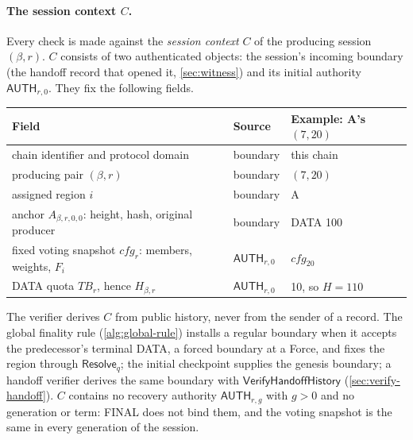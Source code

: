 \documentclass[11pt,a4paper]{article}
\newcommand{\TB}{\mathit{TB}}
\newcommand{\tagg}[1]{\ensuremath{\mathsf{#1}}}
\newcommand{\defterm}[1]{\textcolor{rrBlue}{\textit{#1}}}
\newcounter{protocol}
\begin{document}
\paragraph{The session context $C$.}
Every check is made against the \defterm{session context} $C$ of the
producing session $(\beta,r)$. $C$ consists of two authenticated
objects: the session's incoming boundary (the handoff record that opened
it, \cref{sec:witness}) and its initial authority $\tagg{AUTH}_{r,0}$.
They fix the following fields.
\begin{center}\small
\begin{tabularx}{\linewidth}{@{}>{\raggedright\arraybackslash}p{.36\linewidth}>{\raggedright\arraybackslash}p{.2\linewidth}Y@{}}\toprule
Field & Source & Example: A's $(7,20)$\\\midrule
chain identifier and protocol domain & boundary & this chain\\
producing pair $(\beta,r)$ & boundary & $(7,20)$\\
assigned region $i$ & boundary & A\\
anchor $A_{\beta,r,0,0}$: height, hash, original producer & boundary & DATA 100\\
fixed voting snapshot $\mathit{cfg}_r$: members, weights, $F_i$ & $\tagg{AUTH}_{r,0}$ & $\mathit{cfg}_{20}$\\
DATA quota $\TB_r$, hence $H_{\beta,r}$ & $\tagg{AUTH}_{r,0}$ & 10, so $H=110$\\\bottomrule
\end{tabularx}
\end{center}
The verifier derives $C$ from public history, never from the sender of a
record. The global finality rule (\cref{alg:global-rule}) installs a
regular boundary when it accepts the predecessor's terminal DATA, a
forced boundary at a Force, and fixes the region through
$\tagg{Resolve}_q$; the
initial checkpoint supplies the genesis boundary; a handoff verifier
derives the same boundary with $\tagg{VerifyHandoffHistory}$
(\cref{sec:verify-handoff}). $C$ contains no recovery authority
$\tagg{AUTH}_{r,g}$ with $g>0$ and no generation or term: FINAL does not
bind them, and the voting snapshot is the same in every generation of
the session.
\end{document}
